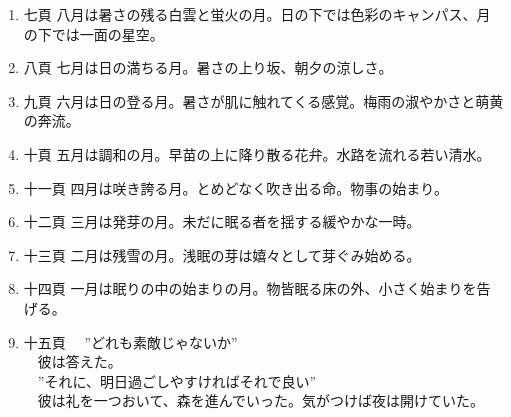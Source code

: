 \documentclass{tarticle}
\begin{document}
\begin{enumerate}
\item 七頁
\label{sec:orga0d6d2f}
\newline
八月は暑さの残る白雲と蛍火の月。日の下では色彩のキャンパス、月の下では一面の星空。\\

\item 八頁
\label{sec:orgd6f3aa6}
\newline
七月は日の満ちる月。暑さの上り坂、朝夕の涼しさ。\\

\item 九頁
\label{sec:org4293521}
\newline
六月は日の登る月。暑さが肌に触れてくる感覚。梅雨の淑やかさと萌黄の奔流。\\

\item 十頁
\label{sec:org7dffc28}
\newline
五月は調和の月。早苗の上に降り散る花弁。水路を流れる若い清水。\\

\item 十一頁
\label{sec:org6a616f7}
\newline
四月は咲き誇る月。とめどなく吹き出る命。物事の始まり。\\

\item 十二頁
\label{sec:orga16a21f}
\newline
三月は発芽の月。未だに眠る者を揺する緩やかな一時。\\

\item 十三頁
\label{sec:org5cf2009}
\newline
二月は残雪の月。浅眠の芽は嬉々として芽ぐみ始める。\\

\item 十四頁
\label{sec:org86aaef9}
\newline
一月は眠りの中の始まりの月。物皆眠る床の外、小さく始まりを告げる。\\

\item 十五頁
\label{sec:orgc2d5875}
\newline
　”どれも素敵じゃないか”\\
　彼は答えた。\\
　”それに、明日過ごしやすければそれで良い”\\

　彼は礼を一つおいて、森を進んでいった。気がつけば夜は開けていた。\\
\end{enumerate}
\end{document}
